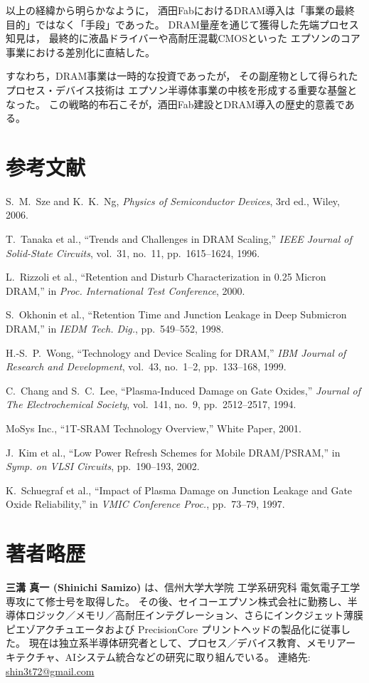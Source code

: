 \documentclass[conference]{IEEEtran}
\begin{document}
以上の経緯から明らかなように，
酒田FabにおけるDRAM導入は「事業の最終目的」ではなく「手段」であった。
DRAM量産を通じて獲得した先端プロセス知見は，
最終的に液晶ドライバーや高耐圧混載CMOSといった
エプソンのコア事業における差別化に直結した。

すなわち，DRAM事業は一時的な投資であったが，
その副産物として得られたプロセス・デバイス技術は
エプソン半導体事業の中核を形成する重要な基盤となった。
この戦略的布石こそが，酒田Fab建設とDRAM導入の歴史的意義である。

\section*{参考文献}
\begin{thebibliography}{00}
S.~M.~Sze and K.~K.~Ng, \emph{Physics of Semiconductor Devices}, 3rd ed., Wiley, 2006.

T.~Tanaka et al., ``Trends and Challenges in DRAM Scaling,'' \emph{IEEE Journal of Solid-State Circuits}, vol.~31, no.~11, pp.~1615--1624, 1996.

L.~Rizzoli et al., ``Retention and Disturb Characterization in 0.25 Micron DRAM,'' in \emph{Proc. International Test Conference}, 2000.

S.~Okhonin et al., ``Retention Time and Junction Leakage in Deep Submicron DRAM,'' in \emph{IEDM Tech. Dig.}, pp.~549--552, 1998.

H.-S.~P.~Wong, ``Technology and Device Scaling for DRAM,'' \emph{IBM Journal of Research and Development}, vol.~43, no.~1–2, pp.~133--168, 1999.

C.~Chang and S.~C.~Lee, ``Plasma-Induced Damage on Gate Oxides,'' \emph{Journal of The Electrochemical Society}, vol.~141, no.~9, pp.~2512--2517, 1994.

MoSys Inc., ``1T-SRAM Technology Overview,'' White Paper, 2001.

J.~Kim et al., ``Low Power Refresh Schemes for Mobile DRAM/PSRAM,'' in \emph{Symp. on VLSI Circuits}, pp.~190--193, 2002.

K.~Schuegraf et al., ``Impact of Plasma Damage on Junction Leakage and Gate Oxide Reliability,'' in \emph{VMIC Conference Proc.}, pp.~73--79, 1997.

\end{thebibliography}

\section*{著者略歴}
\noindent\textbf{三溝 真一 (Shinichi Samizo)} は、信州大学大学院 工学系研究科 電気電子工学専攻にて修士号を取得した。
その後、セイコーエプソン株式会社に勤務し、半導体ロジック／メモリ／高耐圧インテグレーション、さらにインクジェット薄膜ピエゾアクチュエータおよび PrecisionCore プリントヘッドの製品化に従事した。
現在は独立系半導体研究者として、プロセス／デバイス教育、メモリアーキテクチャ、AIシステム統合などの研究に取り組んでいる。
連絡先: \href{mailto:shin3t72@gmail.com}{shin3t72@gmail.com}
\end{document}
